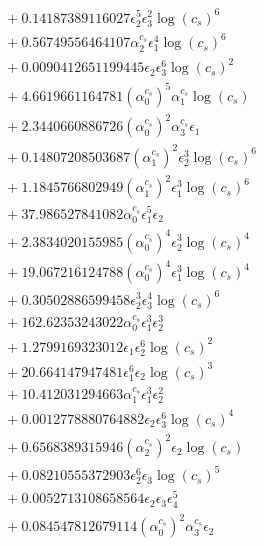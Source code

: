 \documentclass[10pt]{article}
\begin{document}
\begin{align*}
&{}  + 0.14187389116027 \epsilon_{2}^{5} \epsilon_{3}^{2} \log{\left(c_{s} \right)}^{6} \\
&{}  + 0.56749556464107 \alpha_{2}^{c_s} \epsilon_{1}^{4} \log{\left(c_{s} \right)}^{6} \\
&{}  + 0.0090412651199445 \epsilon_{2} \epsilon_{3}^{6} \log{\left(c_{s} \right)}^{2} \\
&{}  + 4.6619661164781 \left(\alpha_{0}^{c_s}\right)^{5} \alpha_{1}^{c_s} \log{\left(c_{s} \right)} \\
&{}  + 2.3440660886726 \left(\alpha_{0}^{c_s}\right)^{2} \alpha_{3}^{c_s} \epsilon_{1} \\
&{}  + 0.14807208503687 \left(\alpha_{1}^{c_s}\right)^{2} \epsilon_{2}^{3} \log{\left(c_{s} \right)}^{6} \\
&{}  + 1.1845766802949 \left(\alpha_{1}^{c_s}\right)^{2} \epsilon_{1}^{3} \log{\left(c_{s} \right)}^{6} \\
&{}  + 37.986527841082 \alpha_{0}^{c_s} \epsilon_{1}^{5} \epsilon_{2} \\
&{}  + 2.3834020155985 \left(\alpha_{0}^{c_s}\right)^{4} \epsilon_{2}^{3} \log{\left(c_{s} \right)}^{4} \\
&{}  + 19.067216124788 \left(\alpha_{0}^{c_s}\right)^{4} \epsilon_{1}^{3} \log{\left(c_{s} \right)}^{4} \\
&{}  + 0.30502886599458 \epsilon_{2}^{3} \epsilon_{3}^{4} \log{\left(c_{s} \right)}^{6} \\
&{}  + 162.62353243022 \alpha_{0}^{c_s} \epsilon_{1}^{3} \epsilon_{2}^{3} \\
&{}  + 1.2799169323012 \epsilon_{1} \epsilon_{2}^{6} \log{\left(c_{s} \right)}^{2} \\
&{}  + 20.664147947481 \epsilon_{1}^{6} \epsilon_{2} \log{\left(c_{s} \right)}^{3} \\
&{}  + 10.412031294663 \alpha_{1}^{c_s} \epsilon_{1}^{3} \epsilon_{2}^{2} \\
&{}  + 0.0012778880764882 \epsilon_{2} \epsilon_{3}^{6} \log{\left(c_{s} \right)}^{4} \\
&{}  + 0.6568389315946 \left(\alpha_{2}^{c_s}\right)^{2} \epsilon_{2} \log{\left(c_{s} \right)} \\
&{}  + 0.08210555372903 \epsilon_{2}^{6} \epsilon_{3} \log{\left(c_{s} \right)}^{5} \\
&{}  + 0.0052713108658564 \epsilon_{2} \epsilon_{3} \epsilon_{4}^{5} \\
&{}  + 0.084547812679114 \left(\alpha_{0}^{c_s}\right)^{2} \alpha_{3}^{c_s} \epsilon_{2} \\

\end{align*}
\end{document}
